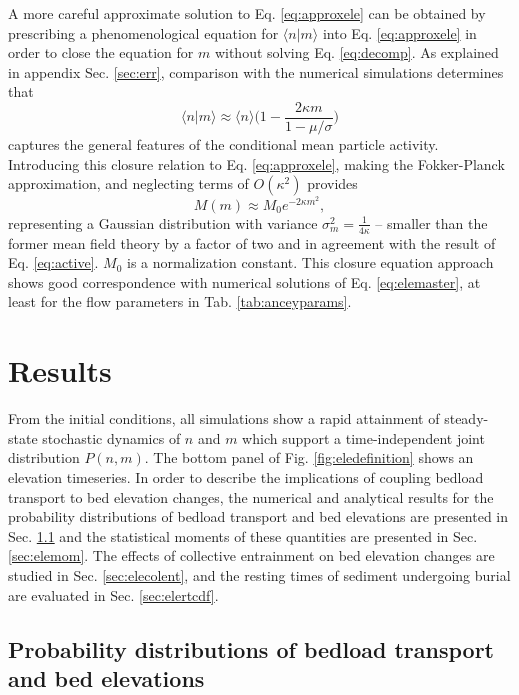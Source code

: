 A more careful approximate solution to Eq. \ref{eq:approxele} can be obtained by prescribing a phenomenological equation for $\langle n | m \rangle$ into Eq. \ref{eq:approxele} in order to close the equation for $m$ without solving Eq. \ref{eq:decomp}.
As explained in appendix Sec. \ref{sec:err}, comparison with the numerical simulations determines that
\begin{equation}
	\langle n | m  \rangle \approx \langle n \rangle \Big( 1 - \frac{2\kappa m}{1-\mu/\sigma}\Big) \label{eq:closure}
\end{equation}
captures the general features of the conditional mean particle activity.
Introducing this closure relation to Eq. \ref{eq:approxele}, making the Fokker-Planck approximation, and neglecting terms of $O(\kappa^2)$ provides 
\begin{equation} M(m) \approx M_0 e^{-2\kappa m^2}, \label{eq:ou2}\end{equation}
representing a Gaussian distribution with variance $\sigma_m^2 = \frac{1}{4\kappa}$ -- smaller than the former mean field theory by a factor of two and in agreement with the result of Eq. \ref{eq:active}.
$M_0$ is a normalization constant. 
This closure equation approach shows good correspondence with numerical solutions of Eq. \ref{eq:elemaster}, at least for the flow parameters in Tab. \ref{tab:anceyparams}.

\section{Results}
\label{sec:eleresults}

From the initial conditions, all simulations show a rapid attainment of steady-state stochastic dynamics of $n$ and $m$ which support a time-independent joint distribution $P(n,m)$. The bottom panel of Fig. \ref{fig:eledefinition} shows an elevation timeseries. In order to describe the implications of coupling bedload transport to bed elevation changes, the numerical and analytical results for the probability distributions of bedload transport and bed elevations are presented in Sec. \ref{sec:elepdf} and the statistical moments of these quantities are presented in Sec. \ref{sec:elemom}. The effects of collective entrainment on bed elevation changes are studied in Sec. \ref{sec:elecolent}, and the resting times of sediment undergoing burial are evaluated in Sec. \ref{sec:elertcdf}.

\subsection{Probability distributions of bedload transport and bed elevations}
\label{sec:elepdf}

